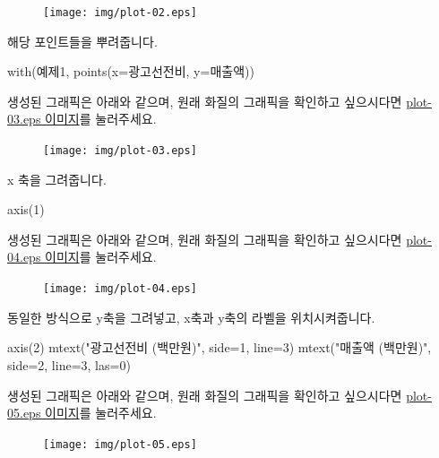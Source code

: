\begin{figure}
\begin{center}
\texttt{[image: img/plot-02.eps]}
\end{center}
\end{figure}


해당 포인트들을 뿌려줍니다.
\begin{Schunk}
\begin{Soutput}	
with(예제1, points(x=광고선전비, y=매출액))
\end{Soutput}
\end{Schunk}
생성된 그래픽은 아래와 같으며, 원래 화질의 그래픽을 확인하고 싶으시다면 \href{http://korea.gnu.org/gnustats/img/plot-03.eps}{plot-03.eps 이미지}를 눌러주세요. 

\begin{figure}
\begin{center}
\texttt{[image: img/plot-03.eps]}
\end{center}
\end{figure}

x 축을 그려줍니다. 
\begin{Schunk}
\begin{Soutput}	
axis(1)
\end{Soutput}
\end{Schunk}
생성된 그래픽은 아래와 같으며, 원래 화질의 그래픽을 확인하고 싶으시다면 \href{http://korea.gnu.org/gnustats/img/plot-04.eps}{plot-04.eps 이미지}를 눌러주세요. 

\begin{figure}
\begin{center}
\texttt{[image: img/plot-04.eps]}
\end{center}
\end{figure}

동일한 방식으로 y축을 그려넣고, x축과 y축의 라벨을 위치시켜줍니다. 
\begin{Schunk}
\begin{Soutput}	
axis(2)
mtext("광고선전비 (백만원)", side=1, line=3)
mtext("매출액 (백만원)", side=2, line=3, las=0)
\end{Soutput}
\end{Schunk}
생성된 그래픽은 아래와 같으며, 원래 화질의 그래픽을 확인하고 싶으시다면 \href{http://korea.gnu.org/gnustats/img/plot-05.eps}{plot-05.eps 이미지}를 눌러주세요. 

\begin{figure}
\begin{center}
\texttt{[image: img/plot-05.eps]}
\end{center}
\end{figure}


